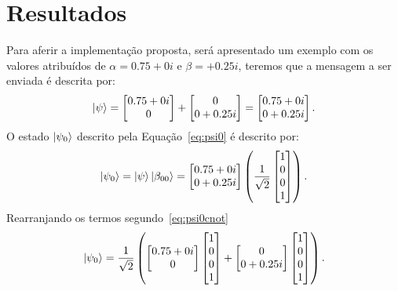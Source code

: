 \chapter{Resultados}

Para aferir a implementação proposta, será apresentado um exemplo com os valores atribuídos de $\alpha = {0.75+0i}$ e $\beta = {+0.25i}$, teremos que a mensagem a ser enviada é descrita por:
\begin{equation}
  \ket{\psi} =  \begin{bmatrix} {0.75+0i} \\ 0 \end{bmatrix} +
  \begin{bmatrix} 0 \\ {0+0.25i} \end{bmatrix} =
  \begin{bmatrix} {0.75+0i} \\ {0+0.25i} \end{bmatrix}.
\end{equation}
O estado $\ket{\psi_0}$ descrito pela Equação~\eqref{eq:psi0} é descrito por:
\begin{equation}
  \ket{\psi_0} = \ket{\psi}\ket{\beta_{00}} =
  \begin{bmatrix} {0.75+0i} \\ {0+0.25i} \end{bmatrix}
  \left(\frac{1}{\sqrt{2}} \begin{bmatrix} 1 \\ 0 \\ 0 \\ 1 \end{bmatrix}\right).
\end{equation}
Rearranjando os termos segundo~\eqref{eq:psi0cnot}
\begin{equation}
  \ket{\psi_0} = \frac{1}{\sqrt{2}}\left(
      \begin{bmatrix} {0.75+0i} \\ 0 \end{bmatrix}
      \begin{bmatrix} 1 \\ 0 \\ 0 \\ 1 \end{bmatrix} +
      \begin{bmatrix} 0 \\ {0+0.25i} \end{bmatrix}
      \begin{bmatrix} 1 \\ 0 \\ 0 \\ 1 \end{bmatrix}\right).
  \end{equation}

